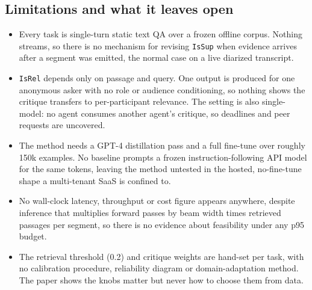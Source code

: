 \subsection{Limitations and what it leaves open}
\begin{itemize}[leftmargin=*, itemsep=1pt, topsep=2pt]
  \item Every task is single-turn static text QA over a frozen offline corpus. Nothing streams, so there is no mechanism for revising \texttt{IsSup} when evidence arrives after a segment was emitted, the normal case on a live diarized transcript.
  \item \texttt{IsRel} depends only on passage and query. One output is produced for one anonymous asker with no role or audience conditioning, so nothing shows the critique transfers to per-participant relevance. The setting is also single-model: no agent consumes another agent's critique, so deadlines and peer requests are uncovered.
  \item The method needs a GPT-4 distillation pass and a full fine-tune over roughly 150k examples. No baseline prompts a frozen instruction-following API model for the same tokens, leaving the method untested in the hosted, no-fine-tune shape a multi-tenant SaaS is confined to.
  \item No wall-clock latency, throughput or cost figure appears anywhere, despite inference that multiplies forward passes by beam width times retrieved passages per segment, so there is no evidence about feasibility under any p95 budget.
  \item The retrieval threshold (0.2) and critique weights are hand-set per task, with no calibration procedure, reliability diagram or domain-adaptation method. The paper shows the knobs matter but never how to choose them from data.
\end{itemize}
